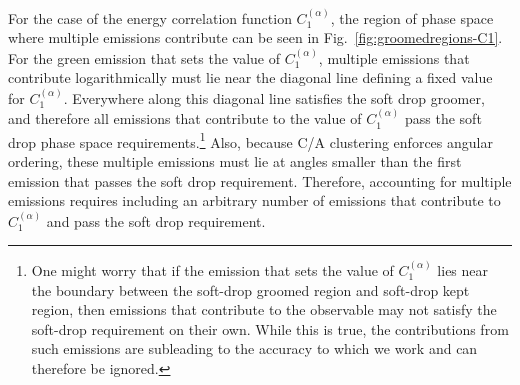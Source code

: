 \documentclass[letterpaper,11pt]{article}
\newcommand{\C}[2]{C^{(#2)}_{#1}}
\newcommand{\ea}{{\C{1}{\alpha}}}
\DeclareRobustCommand{\Fig}[1]{Fig.~\ref{#1}}
\begin{document}
For the case of the energy correlation function $\ea$, the region of phase space where multiple emissions contribute can be seen in \Fig{fig:groomedregions-C1}.  For the green emission that sets the value of $\ea$, multiple emissions that contribute logarithmically must lie near the diagonal line defining a fixed value for $\ea$.  Everywhere along this diagonal line satisfies the soft drop groomer, and therefore all emissions that contribute to the value of $\ea$ pass the soft drop phase space requirements.\footnote{One might worry that if the emission that sets the value of $\ea$ lies near the boundary between the soft-drop groomed region and soft-drop kept region, then emissions that contribute to the observable may not satisfy the soft-drop requirement on their own.  While this is true, the contributions from such emissions are subleading to the accuracy to which we work and can therefore be ignored.}  Also, because C/A clustering enforces angular ordering, these multiple emissions must lie at angles smaller than the first emission that passes the soft drop requirement.  Therefore, accounting for multiple emissions requires including an arbitrary number of emissions that contribute to $\ea$ and pass the soft drop requirement.  
\end{document}
